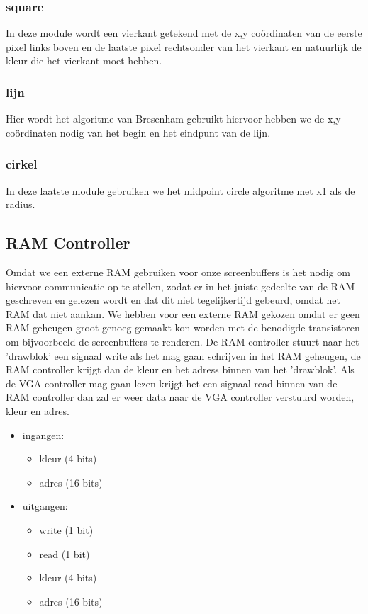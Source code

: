 \subsubsection { square}
In deze module wordt een vierkant getekend met de x,y coördinaten van de eerste pixel links boven en de laatste pixel rechtsonder van het vierkant en natuurlijk de kleur die het vierkant moet hebben.

\subsubsection { lijn}
Hier wordt het algoritme van Bresenham gebruikt hiervoor hebben we de x,y coördinaten nodig van het begin en het eindpunt van de lijn.

\subsubsection { cirkel}
In deze laatste module gebruiken we het midpoint circle algoritme met x1 als de radius.

\subsection{RAM Controller}
Omdat we een externe RAM gebruiken voor onze screenbuffers is het nodig om hiervoor communicatie op te stellen, zodat er in het juiste gedeelte van de RAM geschreven en gelezen wordt en dat dit niet tegelijkertijd gebeurd, omdat het RAM dat niet aankan. We hebben voor een externe RAM gekozen omdat er geen RAM geheugen groot genoeg gemaakt kon worden met de benodigde transistoren om bijvoorbeeld de screenbuffers te renderen. De RAM controller stuurt naar het 'drawblok' een signaal write als het mag gaan schrijven in het RAM geheugen, de RAM controller krijgt dan de kleur en het adress binnen van het 'drawblok'. Als de VGA controller mag gaan lezen krijgt het een signaal read binnen van de RAM controller dan zal er weer data naar de VGA controller verstuurd worden, kleur en adres.

\begin {itemize}
\item ingangen:
\begin {itemize}
\item kleur (4 bits)
\item adres (16 bits)
\end {itemize}
\item uitgangen:
\begin {itemize}
\item write (1 bit)
\item read (1 bit)
\item kleur (4 bits)
\item adres (16 bits)
\end {itemize}
\end {itemize}

